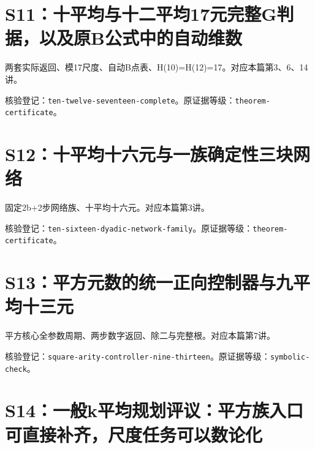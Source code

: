 \documentclass[11pt,a4paper,oneside,openany]{book}
\theoremstyle{definition}\newtheorem{example}[theorem]{例}\newtheorem{conjecture}[theorem]{猜想}
\numberwithin{equation}{chapter}\setcounter{tocdepth}{1}
\begin{document}
\section{S11：十平均与十二平均17元完整G判据，以及原B公式中的自动维数}\label{source:S11}

两套实际返回、模17尺度、自动B点表、H(10)=H(12)=17。对应本篇第3、6、14讲。

\par{}\par

核验登记：{\small\nolinkurl{ten-twelve-seventeen-complete}}。原证据等级：{\small\nolinkurl{theorem-certificate}}。

\section{S12：十平均十六元与一族确定性三块网络}\label{source:S12}

固定2b+2步网络族、十平均十六元。对应本篇第3讲。

\par{}\par

核验登记：{\small\nolinkurl{ten-sixteen-dyadic-network-family}}。原证据等级：{\small\nolinkurl{theorem-certificate}}。

\section{S13：平方元数的统一正向控制器与九平均十三元}\label{source:S13}

平方核心全参数周期、两步数字返回、除二与完整根。对应本篇第7讲。

\par{}\par

核验登记：{\small\nolinkurl{square-arity-controller-nine-thirteen}}。原证据等级：{\small\nolinkurl{symbolic-check}}。

\section{S14：一般k平均规划评议：平方族入口可直接补齐，尺度任务可以数论化}\label{source:S14}
\end{document}
